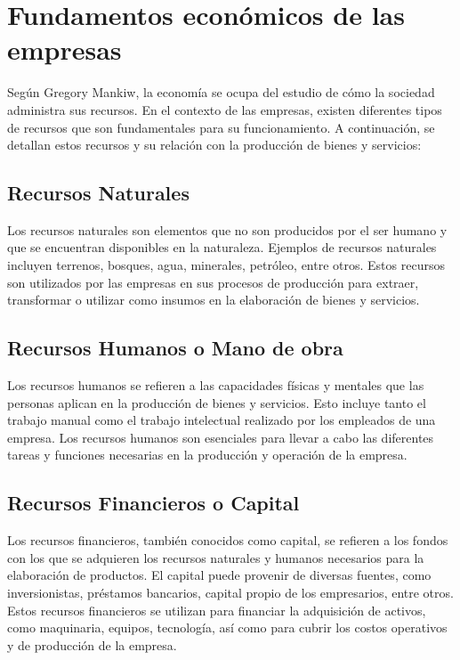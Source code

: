\documentclass[
  a4paper,
]{article}
\begin{document}
\hypertarget{fundamentos-econuxf3micos-de-las-empresas}{%
\section{Fundamentos económicos de las
empresas}\label{fundamentos-econuxf3micos-de-las-empresas}}

Según Gregory Mankiw, la economía se ocupa del estudio de cómo la
sociedad administra sus recursos. En el contexto de las empresas,
existen diferentes tipos de recursos que son fundamentales para su
funcionamiento. A continuación, se detallan estos recursos y su relación
con la producción de bienes y servicios:

\hypertarget{recursos-naturales}{%
\subsection{Recursos Naturales}\label{recursos-naturales}}

Los recursos naturales son elementos que no son producidos por el ser
humano y que se encuentran disponibles en la naturaleza. Ejemplos de
recursos naturales incluyen terrenos, bosques, agua, minerales,
petróleo, entre otros. Estos recursos son utilizados por las empresas en
sus procesos de producción para extraer, transformar o utilizar como
insumos en la elaboración de bienes y servicios.

\hypertarget{recursos-humanos-o-mano-de-obra}{%
\subsection{Recursos Humanos o Mano de
obra}\label{recursos-humanos-o-mano-de-obra}}

Los recursos humanos se refieren a las capacidades físicas y mentales
que las personas aplican en la producción de bienes y servicios. Esto
incluye tanto el trabajo manual como el trabajo intelectual realizado
por los empleados de una empresa. Los recursos humanos son esenciales
para llevar a cabo las diferentes tareas y funciones necesarias en la
producción y operación de la empresa.

\hypertarget{recursos-financieros-o-capital}{%
\subsection{Recursos Financieros o
Capital}\label{recursos-financieros-o-capital}}

Los recursos financieros, también conocidos como capital, se refieren a
los fondos con los que se adquieren los recursos naturales y humanos
necesarios para la elaboración de productos. El capital puede provenir
de diversas fuentes, como inversionistas, préstamos bancarios, capital
propio de los empresarios, entre otros. Estos recursos financieros se
utilizan para financiar la adquisición de activos, como maquinaria,
equipos, tecnología, así como para cubrir los costos operativos y de
producción de la empresa.
\end{document}
